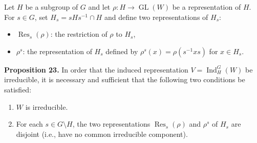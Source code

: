 Let $H$ be a subgroup of $G$ and let $\rho: H \to \operatorname{GL}(W)$ be a representation of $H$. For $s \in G$, set $H_s = sHs^{-1} \cap H$ and define two representations of $H_s$:
\begin{itemize}
  \item $\operatorname{Res}_s(\rho)$: the restriction of $\rho$ to $H_s$,
  \item $\rho^s$: the representation of $H_s$ defined by $\rho^s(x) = \rho(s^{-1}xs)$ for $x \in H_s$.
\end{itemize}

\textbf{Proposition 23.} In order that the induced representation $V = \operatorname{Ind}_H^G(W)$ be irreducible, it is necessary and sufficient that the following two conditions be satisfied:
\begin{enumerate}
  \item[(a)] $W$ is irreducible.
  \item[(b)] For each $s \in G \setminus H$, the two representations $\operatorname{Res}_s(\rho)$ and $\rho^s$ of $H_s$ are disjoint (i.e., have no common irreducible component).
\end{enumerate}
